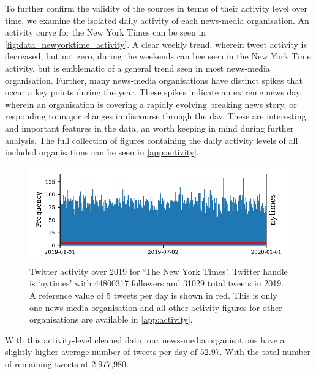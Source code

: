 To further confirm the validity of the sources in terms of their activity level over time, we examine the isolated daily activity of each news-media organisation. An activity curve for the New York Times can be seen in \autoref{fig:data_newyorktime_activity}. 
A clear weekly trend, wherein tweet activity is decreased, but not zero, during the weekends can bee seen in the New York Time activity, but is emblematic of a general trend seen in most news-media organisation. Further, many news-media organisations have distinct spikes that occur a key points during the year. These spikes indicate an extreme news day, wherein an organisation is covering a rapidly evolving breaking news story, or responding to major changes in discourse through the day. These are interesting and important features in the data, an worth keeping in mind during further analysis. The full collection of figures containing the daily activity levels of all included organisations can be seen in \autoref{app:activity}.

\begin{figure}[h!]
\centering
	\includegraphics{appendix2/figs/tweet_times/nytimes.pdf}
	\caption{Twitter activity over 2019 for `The New York Times'.
		Twitter handle is `nytimes' with 44800317 followers and 31029 total tweets in 2019. A reference value of 5 tweets per day is shown in red. This is only one news-media organisation and all other activity figures for other organisations are available in \autoref{app:activity}, }
	\label{fig:data_newyorktime_activity}
\end{figure}

With this activity-level cleaned data, our news-media organisations have a slightly higher average number of tweets per day of 52.97. With the total number of remaining tweets at 2,977,980.

